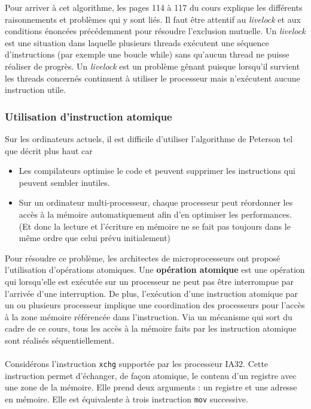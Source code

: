 Pour arriver à cet algorithme, les pages 114 à 117 du cours explique les différents raisonnements et problèmes qui y sont liés.
Il faut être attentif au \textit{livelock} et aux conditions énoncées précédemment pour résoudre l'exclusion mutuelle.
Un \textit{livelock} est une situation dans laquelle plusieurs threads exécutent une séquence d'instructions (par exemple une boucle while) sans qu'aucun thread ne puisse réaliser de progrès.
Un \textit{livelock} est un problème gênant puisque lorsqu'il survient les threads concernés continuent à utiliser le processeur mais n'exécutent aucune instruction utile. \\

\subsubsection*{Utilisation d'instruction atomique}
Sur les ordinateurs actuels, il est difficile d'utiliser l'algorithme de Peterson tel que décrit plus haut car
\begin{itemize}
  \item Les compilateurs optimise le code et peuvent supprimer les instructions qui peuvent sembler inutiles.
  \item Sur un ordinateur multi-processeur, chaque processeur peut réordonner les accès à la mémoire automatiquement afin d'en optimiser les performances.
    (Et donc la lecture et l'écriture en mémoire ne se fait pas toujours dans le même ordre que celui prévu initialement)
\end{itemize}
Pour résoudre ce problème, les architectes de microprocesseurs ont proposé l'utilisation d'opérations atomiques.
Une \textbf{opération atomique} est une opération qui lorsqu'elle est exécutée sur un processeur ne peut pas être interrompue par l'arrivée d'une interruption.
De plus, l'exécution d'une instruction atomique par un ou plusieurs processeur implique une coordination des processeurs pour l'accès à la zone mémoire référencée dans l'instruction.
Via un mécanisme qui sort du cadre de ce cours, tous les accès à la mémoire faits par les instruction atomique sont réalisés séquentiellement. \\
\\
Considérons l'instruction \texttt{xchg} supportée par les processeur IA32.
Cette instruction permet d'échanger, de façon atomique, le contenu d'un registre avec une zone de la mémoire.
Elle prend deux arguments : un registre et une adresse en mémoire.
Elle est équivalente à trois instruction \texttt{mov} successive. \\
